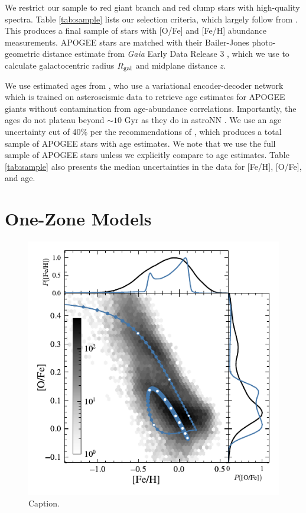 \documentclass[twocolumn,twocolappendix,linenumbers]{aastex631}
\begin{document}
We restrict our sample to red giant branch and red clump stars with high-quality spectra. Table \ref{tab:sample} lists our selection criteria, which largely follow from \citet{Hayden2015-ChemicalCartography}. This produces a final sample of stars with [O/Fe] and [Fe/H] abundance measurements. APOGEE stars are matched with their Bailer-Jones photo-geometric distance estimate from \textit{Gaia} Early Data Release 3 \citep{gaia_collaboration_gaia_2016,gaia_collaboration_gaia_2021}, which we use to calculate galactocentric radius $R_{\rm gal}$ and midplane distance $z$.

We use estimated ages from \citet[][hereafter ]{leung_variational_2023}, who use a variational encoder-decoder network which is trained on asteroseismic data to retrieve age estimates for APOGEE giants without contamination from age-abundance correlations. Importantly, the  ages do not plateau beyond $\sim10$ Gyr as they do in astroNN \citep{Mackereth2019-astroNN-Ages}. We use an age uncertainty cut of 40\% per the recommendations of , which produces a total sample of APOGEE stars with age estimates. We note that we use the full sample of APOGEE stars unless we explicitly compare to age estimates. Table \ref{tab:sample} also presents the median uncertainties in the data for [Fe/H], [O/Fe], and age.

\section{One-Zone Models}
\label{sec:onezone-results}

\begin{figure}
    \centering
    \includegraphics{figures/onezone_sfr.pdf}
    \caption{Caption.}
    \label{fig:onezone-sfr}
\end{figure}
\end{document}
